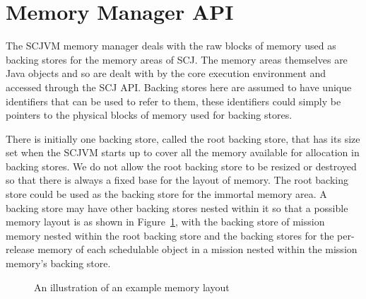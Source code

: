 \documentclass[a4paper,10pt]{report}
\begin{document}
\section{Memory Manager API}
\label{memory-manager-section}

The SCJVM memory manager deals with the raw blocks of memory used as backing
stores for the memory areas of SCJ. The memory areas themselves are Java objects
and so are dealt with by the core execution environment and accessed through the
SCJ API. Backing stores here are assumed to have unique identifiers that can be
used to refer to them, these identifiers could simply be pointers to the
physical blocks of memory used for backing stores.

There is initially one backing store, called the root backing store, that has
its size set when the SCJVM starts up to cover all the memory available for
allocation in backing stores. We do not allow the root backing store to be
resized or destroyed so that there is always a fixed base for the layout of 
memory. The root backing store could be used as the backing store for the
immortal memory area. A backing store may have other backing stores nested
within it so that a possible memory layout is as shown in 
Figure~\ref{memory-fig}, with the backing store of mission memory nested within
the root backing store and the backing stores for the per-release memory of each
schedulable object in a mission nested within the mission memory's backing
store.

\begin{figure}[ht]
  \centering
  \caption{An illustration of an example memory layout}
  \label{memory-fig}
\end{figure}
\end{document}
